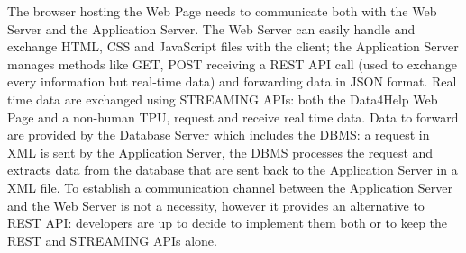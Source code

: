 The browser hosting the Web Page needs to communicate both with the Web Server and the Application Server. 
The Web Server can easily handle and exchange HTML, CSS and JavaScript files with the client; the Application Server manages methods like GET, POST receiving a REST API call (used to exchange every information but real-time data) and forwarding data in JSON format. Real time data are exchanged using STREAMING APIs: both the Data4Help Web Page and a non-human TPU, request and receive real time data. Data to forward are provided by the Database Server which includes the DBMS: a request in XML is sent by the Application Server, the DBMS processes the request and extracts data from the database that are sent back to the Application Server in a XML file. To establish a communication channel between the Application Server and the Web Server is not a necessity, however it provides an alternative to REST API: developers are up to decide to implement them both or to keep the REST and STREAMING APIs alone. 


